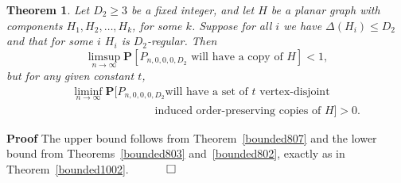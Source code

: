 \documentclass{article}
\newtheorem{Theorem}{Theorem}
\newtheorem{Proof of Theorem}{Proof of Theorem}
\begin{document}
\begin{Theorem} \label{bounded806}
Let $D_{2} \geq 3$ be a fixed integer,
and let $H$ be a planar graph with components $H_{1},H_{2}, \ldots, H_{k}$, for some $k$.
Suppose for all $i$ we have $\Delta(H_{i}) \leq D_{2}$
and that for some $i$ $H_{i}$ is $D_{2}$-regular.
Then
\begin{displaymath}
\limsup_{n \to \infty} \mathbf{P} [P_{n,0,0,0,D_{2}}
\textrm{ will have a copy of $H$}] < 1,
\end{displaymath}
but for any given constant $t$,
\begin{eqnarray*}
& & \liminf_{n \to \infty} \mathbf{P} \Big[
\textrm{$P_{n,0,0,0,D_{2}}$
will have a set of $t$ vertex-disjoint} \\
& & \phantom{wwwwwwwwwwi}\textrm{induced order-preserving copies of $H$}\Big]
>0.
\end{eqnarray*}
\end{Theorem}
\textbf{Proof}
The upper bound follows from Theorem~\ref{bounded807}
and the lower bound from Theorems~\ref{bounded803} and~\ref{bounded802},
exactly as in Theorem~\ref{bounded1002}.
$\phantom{qwerty}
\setlength{\unitlength}{.25cm}
\begin{picture}(1,1)
\put(0,0){\line(1,0){1}}
\put(0,0){\line(0,1){1}}
\put(1,1){\line(-1,0){1}}
\put(1,1){\line(0,-1){1}}
\end{picture}$ 













































\newpage
\section{} \label{unbounded}
\end{document}

